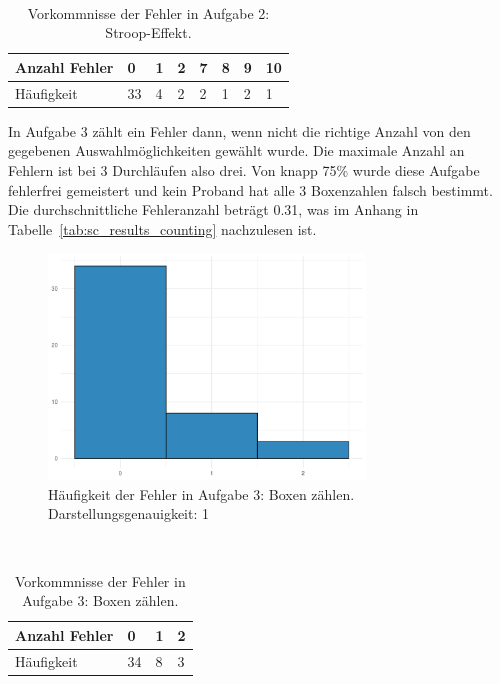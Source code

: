 \begin{table}
	\caption{Vorkommnisse der Fehler in Aufgabe 2: Stroop-Effekt.}~\label{tab:matchingMistakeNumbers}
	
	\setlength\tabcolsep{3pt}
	\renewcommand{\arraystretch}{1.4}%
	\begin{tabularx}{\textwidth}{ | l | x | x | x | x | x | x | x | }
		\hline
		Anzahl Fehler & 0   & 1  & 2  & 7  & 8  & 9 & 10 \\ \hline\hline
		Häufigkeit 	  & 33  & 4  & 2  & 2  & 1  & 2 & 1  \\ \hline
	\end{tabularx}
\end{table}

In Aufgabe 3 zählt ein Fehler dann, wenn nicht die richtige Anzahl von den gegebenen Auswahlmöglichkeiten gewählt wurde. Die maximale Anzahl an Fehlern ist bei 3 Durchläufen also drei.
Von knapp 75\% wurde diese Aufgabe fehlerfrei gemeistert und kein Proband hat alle 3 Boxenzahlen falsch bestimmt. Die durchschnittliche Fehleranzahl beträgt 0.31, was im Anhang in Tabelle~\ref{tab:sc_results_counting} nachzulesen ist.

\begin{figure}[H]
	\centering
	\includegraphics[width=0.75\textwidth]{./_StudyResults/countingMisHist}
	\caption{Häufigkeit der Fehler in Aufgabe 3: Boxen zählen. Darstellungsgenauigkeit: 1}
	\label{fig:countingMistakeHistogram}
\end{figure}

\begin{table}
	\caption{Vorkommnisse der Fehler in Aufgabe 3: Boxen zählen.}~\label{tab:countingMistakeNumbers}
	
	\setlength\tabcolsep{3pt}
	\renewcommand{\arraystretch}{1.4}%
	\begin{tabularx}{\textwidth}{ | l | x | x | x | }
		\hline
		Anzahl Fehler & 0   & 1  & 2 \\ \hline\hline
		Häufigkeit 	  & 34  & 8  & 3 \\ \hline
	\end{tabularx}
\end{table}


